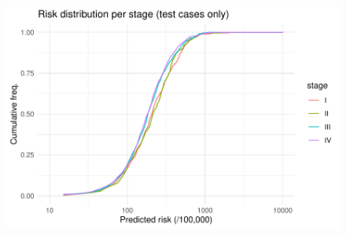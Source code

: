 \documentclass[12pt]{article}
\begin{document}
\begin{figure}[h]
\centering
\includegraphics[width=1.0\textwidth]{figures/risk_stage.pdf}
\end{figure}
\end{document}
